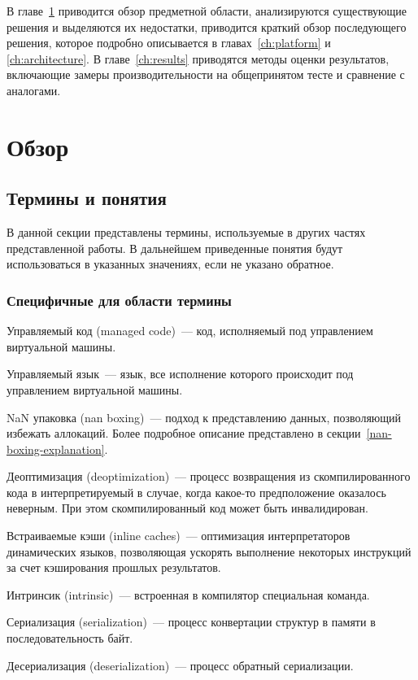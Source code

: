 \documentclass[times
,titlepage
]{itmo-student-thesis}
\begin{document}
В главе~\ref{ch:overview} приводится обзор предметной области, анализируются существующие решения и выделяются их недостатки, приводится краткий обзор последующего решения, которое подробно описывается в главах~\ref{ch:platform} и \ref{ch:architecture}. В главе~\ref{ch:results} приводятся методы оценки результатов, включающие замеры производительности на общепринятом тесте и сравнение с аналогами.

\chapter{Обзор}\label{ch:overview}

\startrelatedwork

\section{Термины и понятия}
В данной секции представлены термины, используемые в других частях представленной работы. В дальнейшем приведенные понятия будут использоваться в указанных значениях, если не указано обратное.
\def\MakeTerm#1#2{#1~--- #2.\par}
\subsection{Специфичные для области термины}
	\MakeTerm{Управляемый код (managed code)}{код, исполняемый под управлением виртуальной машины}
	\MakeTerm{Управляемый язык}{язык, все исполнение которого происходит под управлением виртуальной машины}
	\MakeTerm{NaN упаковка (nan boxing)}{подход к представлению данных, позволяющий избежать аллокаций. Более подробное описание представлено в секции~\ref{nan-boxing-explanation}}
	\MakeTerm{Деоптимизация (deoptimization)}{процесс возвращения из скомпилированного кода в интерпретируемый в случае, когда какое-то предположение оказалось неверным. При этом скомпилированный код может быть инвалидирован}
	\MakeTerm{Встраиваемые кэши (inline caches)}{оптимизация интерпретаторов динамических языков, позволяющая ускорять выполнение некоторых инструкций за счет кэширования прошлых результатов}
	\MakeTerm{Интринсик (intrinsic)}{встроенная в компилятор специальная команда}
	\MakeTerm{Сериализация (serialization)}{процесс конвертации структур в памяти в последовательность байт}
	\MakeTerm{Десериализация (deserialization)}{процесс обратный сериализации}
\end{document}
